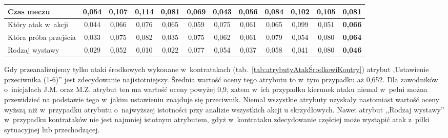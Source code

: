 \documentclass[a4paper,twoside,12pt]{book}
\begin{document}
\begin{table}
\begin{adjustbox}{angle=90}
\begin{tabular}{|l|c|c|c|c|c|c|c|c|c|c|c|}
Czas meczu & 0,054 & 0,107 & 0,114 & 0,081 & 0,069 & 0,043 & 0,056 & 0,084 & 0,102 & 0,105 & \textbf{0,081} \\ \hline
Który atak w~akcji & 0,044 & 0,066 & 0,076 & 0,065 & 0,059 & 0,075 & 0,061 & 0,065 & 0,099 & 0,051 & \textbf{0,066} \\ \hline
Która próba przejścia & 0,033 & 0,075 & 0,082 & 0,035 & 0,075 & 0,062 & 0,061 & 0,079 & 0,054 & 0,080 & \textbf{0,064} \\ \hline
Rodzaj wystawy & 0,029 & 0,052 & 0,010 & 0,022 & 0,077 & 0,054 & 0,037 & 0,058 & 0,041 & 0,080 & \textbf{0,046} \\ \hline
\end{tabular}
\end{adjustbox}
\end{table}

Gdy przeanalizujemy tylko ataki środkowych wykonane w~kontratakach (tab.~\ref{tab:atrybutyAtakŚrodkowiKontry}) atrybut ,Ustawienie przeciwnika (1-6)'' jest zdecydowanie najistotniejszy. Średnia wartość oceny tego atrybutu to w~tym przypadku aż 0,652. Dla zawodników o~inicjałach J.M. oraz M.Z. atrybut ten ma wartość oceny powyżej 0,9, zatem w~ich przypadku kierunek ataku niemal w~pełni można przewidzieć na podstawie tego w~jakim ustawieniu znajduje się przeciwnik.  Niemal wszystkie atrybuty uzyskały nastomiast wartość oceny wyższą niż w~przypadku atrybutu o~najwyższej istotności przy analizie wszystkich akcji u skrzydłowych. Nawet atrybut ,,Rodzaj wystawy'' w~przypadku kontrataków nie jest najmniej istotnym atrybutem, gdyż w~kontrataku zdecydowanie częściej może wystąpić atak z~piłki sytuacyjnej lub przechodzącej.
\end{document}
